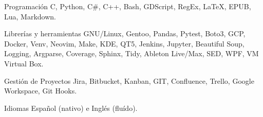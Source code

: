 

\begin{cvskills}

  \cvskill
    {Programación} %
    {C, Python, C\#, C++, Bash, GDScript, RegEx, LaTeX, EPUB, Lua, Markdown.} %

  \cvskill
    {Librerías y herramientas}
    {GNU/Linux, Gentoo, Pandas, Pytest, Boto3, GCP, Docker, Venv, Neovim, Make, KDE, QT5, Jenkins, Jupyter,}
  \cvskill
    {}
    {Beautiful Soup, Logging, Argparse, Coverage, Sphinx, Tidy, Ableton Live/Max, SED, WPF, VM Virtual Box.}

  \cvskill
    {Gestión de Proyectos}
    {Jira, Bitbucket, Kanban, GIT, Confluence, Trello, Google Workspace, Git Hooks.}

  \cvskill
    {Idiomas}
    {Español (nativo) e Inglés (fluído).}


\end{cvskills}
